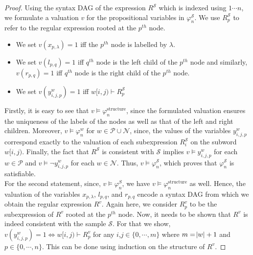 \begin{proof}
    Using the syntax DAG of the expression $R^{\mathcal S}$ which is indexed using $1\cdots n$, we formulate a valuation $v$ for the propositional variables in $\varphi^{\mathcal S}_n$. We use $R_p^{\mathcal S}$ to refer to the regular expression rooted at the $p^{th}$ node.  
    \begin{itemize}[label=$-$]
    \item We set $v(x_{p,\lambda})=1$ iff the $p^{th}$ node is labelled by $\lambda$.   
    \item We set $v(l_{p,q})=1$ iff $q^{th}$ node is the left child of the $p^{th}$ node and similarly,  $v(r_{p,q})=1$  iff $q^{th}$ node is the right child of the $p^{th}$ node.
    \item We set $v(y^w_{i,j,p})=1$ iff $w[i,j)\vdash R_p^{\mathcal S}$ 
    \end{itemize}
Firstly, it is easy to see that $v\models \varphi_n^{\text{structure}}$, since the formulated valuation ensures the uniqueness of the labels of the nodes as well as that of the left and right children. Moreover, $v\models \varphi^w_n$ for $w\in \mathcal{P}\cup \mathcal{N}$, since, the values of the variables
$y^w_{i,j,p}$ correspond exactly to the valuation of each subexpression $R_i^{\mathcal S}$ on the subword $w[i,j)$. Finally, the fact that $R^{\mathcal S}$ is consistent with $\mathcal S$ implies $v\models y^w_{i,j,p}$ for each $w\in \mathcal P$ and $v\models\neg y^{w}_{i,j,p}$ for each $w\in \mathcal N$. Thus, $v\models \varphi^{\mathcal S}_n$, which proves that $\varphi^{\mathcal S}_n$ is satisfiable.
\\

For the second statement, since, $v\models \varphi^S_n$, we have $v\models \varphi^{\text{structure}}_n$ as well. Hence, the valuation of the variables $x_{p,\lambda}$, $l_{p,q}$, and $r_{p,q}$ encode a syntax DAG from which we obtain the regular expression $R^v$. Again here, we consider $R_p^v$ to be the subexpression of $R^v$ rooted at the $p^{th}$ node. Now, it needs to be shown that $R^v$ is indeed consistent with the sample $\mathcal S$. For that we show, ${v(y^w_{i,j,p})=1 \iff w[i,j)\vdash R^v_p}$ for any $i$,$j\in \{0,\cdots, m\}$ where $m=\abs{w}+1$ and $p\in \{0,\cdots, n\}$. This can be done using induction on the structure of $R^v$.


\end{proof}
